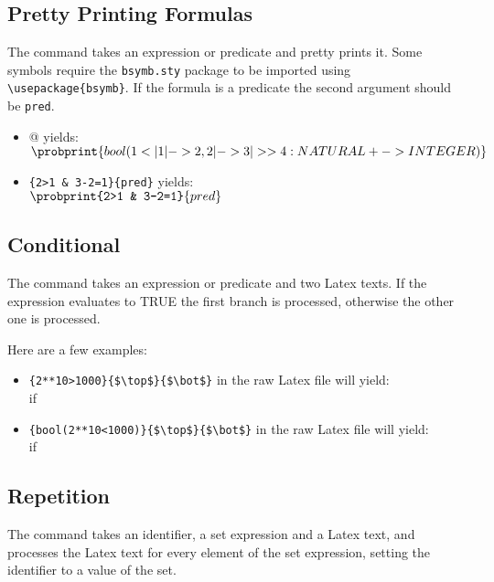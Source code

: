 \documentclass[final]{llncs}
\newcommand{\probif}[3]{if} %
\begin{document}
\subsection{Pretty Printing Formulas}

The {\tt {}} command takes an expression or predicate and pretty prints it.
Some symbols require the {\tt bsymb.sty} package to be imported using \verb+\usepackage{bsymb}+.
If the formula is a predicate the second argument should be \verb+pred+.

\begin{itemize}
   \item {}@ yields:\\
    $\probprint{bool({1}<|{1|->2,2|->3}|>>{4}:NATURAL+->INTEGER)}$
   \item {}\verb+{2>1 & 3-2=1}{pred}+ yields:\\
    $\probprint{2>1 & 3-2=1}{pred}$
\end{itemize}


\subsection{Conditional}

The {\tt {}} command takes an expression or predicate and two Latex texts.
If the expression evaluates to TRUE the first branch is processed, otherwise the other one is processed.

Here are a few examples:
\begin{itemize}
   \item  {}\verb+{2**10>1000}{$\top$}{$\bot$}+ in the raw Latex file will yield:\\
   
        \probif{2**10>1000}{$\top$}{$\bot$}
   \item  {}\verb+{bool(2**10<1000)}{$\top$}{$\bot$}+ in the raw Latex file will yield:\\
   
        \probif{bool(2**10<1000)}{$\top$}{$\bot$}

\end{itemize}


\subsection{Repetition}
The {\tt {}} command takes an identifier, a set expression and a Latex text,
 and processes the Latex text for every element of the set expression, setting the identifier to
 a value of the set.
\end{document}
